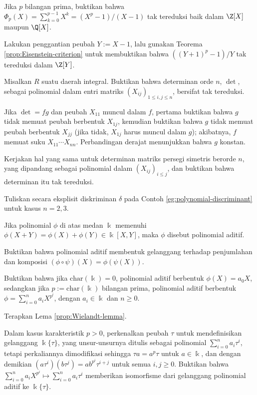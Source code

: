 \begin{Exercises}
\begin{inparaenum}[(i)]
		\end{inparaenum}
	\item Jika $p$ bilangan prima, buktikan bahwa $\Phi_p(X) = \sum_{k=0}^{p-1} X^k = (X^p - 1)/(X - 1)$ tak tereduksi baik dalam $\Z[X]$ maupun $\Q[X]$. \begin{hint} Lakukan penggantian peubah $Y := X-1$, lalu gunakan Teorema \ref{prop:Eisenstein-criterion} untuk membuktikan bahwa $\left( (Y+1)^p - 1\right)/Y$ tak tereduksi dalam $\Z[Y]$. \end{hint}
	\item Misalkan $R$ suatu daerah integral. Buktikan bahwa determinan orde $n$, $\det$, sebagai polinomial dalam entri matriks $(X_{ij})_{1 \leq i,j \leq n}$, bersifat tak tereduksi. \begin{hint} Jika $\det = fg$ dan peubah $X_{11}$ muncul dalam $f$, pertama buktikan bahwa $g$ tidak memuat peubah berbentuk $X_{1j}$, kemudian buktikan bahwa $g$ tidak memuat peubah berbentuk $X_{jj}$ (jika tidak, $X_{1j}$ harus muncul dalam $g$); akibatnya, $f$ memuat suku $X_{11} \cdots X_{nn}$. Perbandingan derajat menunjukkan bahwa $g$ konstan. \end{hint}
	\item Kerjakan hal yang sama untuk determinan matriks persegi simetris berorde $n$, yang dipandang sebagai polinomial dalam $(X_{ij})_{i \leq j}$, dan buktikan bahwa determinan itu tak tereduksi.
	\item Tuliskan secara eksplisit diskriminan $\delta$ pada Contoh \ref{eg:polynomial-discriminant} untuk kasus $n=2,3$.
	\item Jika polinomial $\phi$ di atas medan $\Bbbk$ memenuhi $\phi(X+Y)=\phi(X)+\phi(Y) \in \Bbbk[X,Y]$, maka $\phi$ disebut polinomial aditif.
		\begin{compactenum}[(i)]
			\item Buktikan bahwa polinomial aditif membentuk gelanggang terhadap penjumlahan dan komposisi $(\phi \circ \psi)(X) = \phi(\psi(X))$.
			\item Buktikan bahwa jika $\text{char}(\Bbbk)=0$, polinomial aditif berbentuk $\phi(X) = a_0 X$, sedangkan jika $p := \text{char}(\Bbbk)$ bilangan prima, polinomial aditif berbentuk $\phi = \sum_{i=0}^n a_i X^{p^i}$, dengan $a_i \in \Bbbk$ dan $n \geq 0$. \begin{hint} Terapkan Lema \ref{prop:Wielandt-lemma}.\end{hint}
			\item Dalam kasus karakteristik $p > 0$, perkenalkan peubah $\tau$ untuk mendefinisikan gelanggang $\Bbbk\{\tau\}$, yang unsur-unsurnya ditulis sebagai polinomial $\sum_{i=0}^n a_i \tau^i$, tetapi perkaliannya dimodifikasi sehingga $\tau a = a^p \tau$ untuk $a \in \Bbbk$, dan dengan demikian $(a \tau^i)(b\tau^j) = ab^{p^i} \tau^{i+j}$ untuk semua $i,j \geq 0$. Buktikan bahwa $\sum_{i=0}^n a_i X^{p^i} \mapsto \sum_{i=0}^n a_i \tau^i$ memberikan isomorfisme dari gelanggang polinomial aditif ke $\Bbbk\{\tau\}$.
		\end{compactenum}
\end{Exercises}
